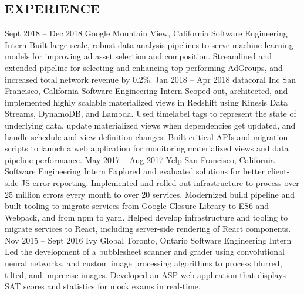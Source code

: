 \documentclass{resume}
\begin{document}
  \begin{main}
    \vspace{0.2cm}%
    \section{EXPERIENCE}
      \begin{entrylist}
        \rightentry%
          {Sept 2018 -- Dec 2018}%
          {Google}%
          {Mountain View, California}%
          {Software Engineering Intern}%
          {\createlist%
            {%
              Built large-scale, robust data analysis pipelines to serve machine learning %
              models for improving ad asset selection and composition. %
            }%
            {%
              Streamlined and extended pipeline for selecting and enhancing top performing %
              AdGroups, and increased total network revenue by 0.2\%. %
            }%
          }
        \rightentry%
          {Jan 2018 -- Apr 2018}%
          {datacoral Inc}%
          {San Francisco, California}%
          {Software Engineering Intern}%
          {\createlist%
            {%
              Scoped out, architected, and implemented highly scalable materialized views in %
              Redshift using Kinesis Data Streams, DynamoDB, and Lambda. %
            }%
            {%
              Used timelabel tags to represent the state of underlying data, update materialized %
              views when dependencies get updated, and handle schedule and view definition %
              changes. %
            }%
            {%
              Built critical APIs and migration scripts to launch a web application for monitoring %
              materialized views and data pipeline performance. %
            }%
          }
        \rightentry%
          {May 2017 -- Aug 2017}%
          {Yelp}%
          {San Francisco, California}%
          {Software Engineering Intern}%
          {\createlist%
            {%
              Explored and evaluated solutions for better client-side JS error reporting. %
            }%
            {%
              Implemented and rolled out infrastructure to process over 25 million errors every %
              month to over 20 services. %
            }%
            {%
              Modernized build pipeline and built tooling to migrate services from Google Closure %
              Library to ES6 and Webpack, and from npm to yarn. %
            }%
            {%
              Helped develop infrastructure and tooling to migrate services to React, including %
              server-side rendering of React components. %
            }%
          }
        \rightentry%
          {Nov 2015 -- Sept 2016}%
          {Ivy Global}%
          {Toronto, Ontario}%
          {Software Engineering Intern}%
          {\createlist%
            {%
              Led the development of a bubblesheet scanner and grader using convolutional neural %
              networks, and custom image processing algorithms to process blurred, tilted, and %
              imprecise images. %
            }%
            {%
              Developed an ASP web application that displays SAT scores and statistics for mock %
              exams in real-time. %
            }%
          }
      \end{entrylist}

\end{main}
\end{document}
